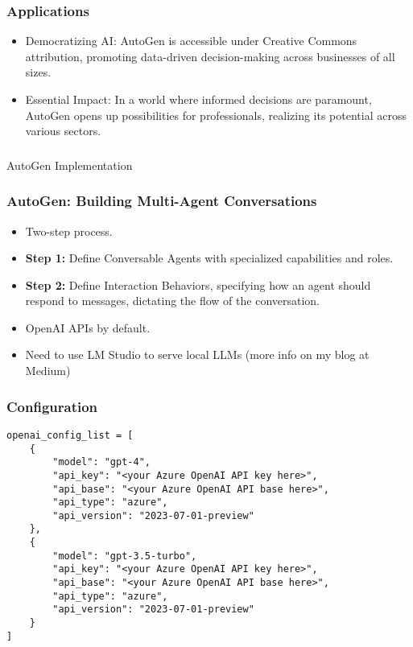 \begin{frame}[fragile]\frametitle{Applications}
  \begin{itemize}
    \item Democratizing AI: AutoGen is accessible under Creative Commons attribution, promoting data-driven decision-making across businesses of all sizes.
    \item Essential Impact: In a world where informed decisions are paramount, AutoGen opens up possibilities for professionals, realizing its potential across various sectors.
  \end{itemize}
\end{frame}

\begin{frame}[fragile]\frametitle{}
\begin{center}
{\Large AutoGen Implementation}
\end{center}
\end{frame}


\begin{frame}[fragile]\frametitle{AutoGen: Building Multi-Agent Conversations}
  \begin{itemize}
    \item Two-step process.
    \item \textbf{Step 1:} Define Conversable Agents with specialized capabilities and roles.
    \item \textbf{Step 2:} Define Interaction Behaviors, specifying how an agent should respond to messages, dictating the flow of the conversation.
    \item OpenAI APIs by default.
	\item Need to use LM Studio to serve local LLMs (more info on my blog at Medium)
  \end{itemize}
\end{frame}

\begin{frame}[fragile]\frametitle{Configuration}
  \begin{lstlisting}
openai_config_list = [
    {
        "model": "gpt-4",
        "api_key": "<your Azure OpenAI API key here>",
        "api_base": "<your Azure OpenAI API base here>",
        "api_type": "azure",
        "api_version": "2023-07-01-preview"
    },
    {
        "model": "gpt-3.5-turbo",
        "api_key": "<your Azure OpenAI API key here>",
        "api_base": "<your Azure OpenAI API base here>",
        "api_type": "azure",
        "api_version": "2023-07-01-preview"
    }
]
  \end{lstlisting}
\end{frame}

